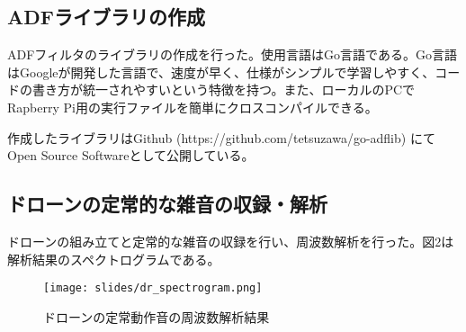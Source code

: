 \documentclass[a4paper, twocolumn]{ltjsarticle}
\begin{document}
  \subsection{ADFライブラリの作成}
    ADFフィルタのライブラリの作成を行った。使用言語はGo言語である。Go言語はGoogleが開発した言語で、速度が早く、仕様がシンプルで学習しやすく、コードの書き方が統一されやすいという特徴を持つ。また、ローカルのPCでRapberry Pi用の実行ファイルを簡単にクロスコンパイルできる。

    作成したライブラリはGithub (https://github.com/tetsuzawa/go-adflib) にてOpen Source Softwareとして公開している。

  \subsection{ドローンの定常的な雑音の収録・解析}
    ドローンの組み立てと定常的な雑音の収録を行い、周波数解析を行った。図2は解析結果のスペクトログラムである。
    \begin{figure}[h]
      \centering
      \texttt{[image: slides/dr\_spectrogram.png]} \\
      \caption{ドローンの定常動作音の周波数解析結果}
      \label{fig:dr_spectrogram}
  \end{figure}

    
    
  



\end{document}
